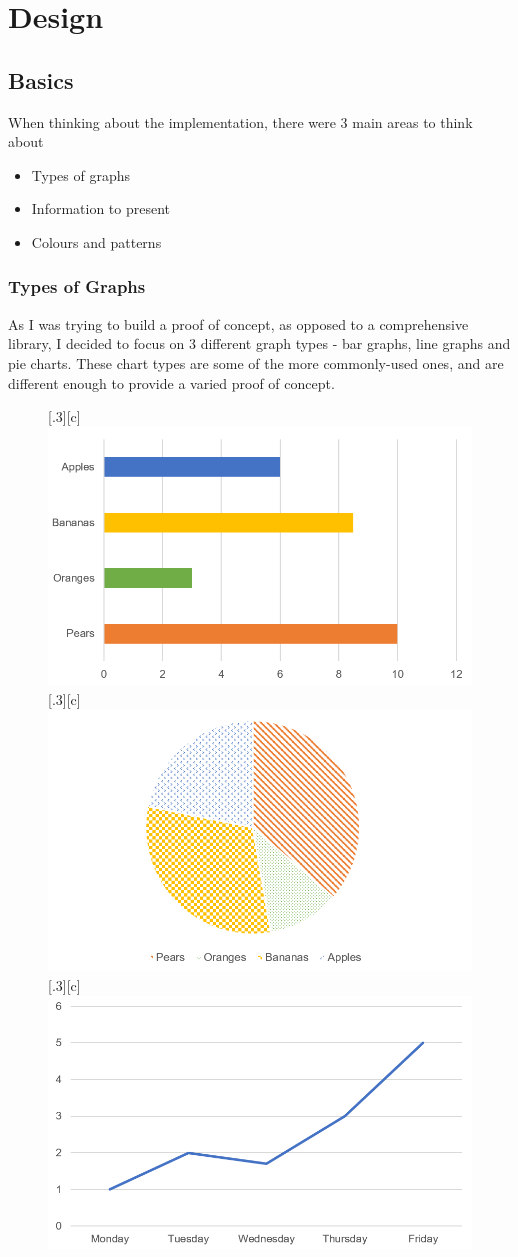 \documentclass[ %
                    author={Aleena Baig},
                supervisor={Dr Simon Lock},
                    degree={BSc},
                     title={On Making Web Accessible Graphs},
                  subtitle={},
                      year={2019} ]{dissertation}
\begin{document}

\chapter{Design}

\section{Basics}

When thinking about the implementation, there were 3 main areas to think about

\begin{itemize}
    \item Types of graphs
    \item Information to present
    \item Colours and patterns
\end{itemize}

\subsection{Types of Graphs}

As I was trying to build a proof of concept, as opposed to a comprehensive library, I decided to focus on 3 different graph types - bar graphs, line graphs and pie charts. These chart types are some of the more commonly-used ones, and are different enough to provide a varied proof of concept.
\newline
\begin{figure}[H]
  \centering
  [.3\linewidth][c]{%
    \includegraphics[width=.3\linewidth]{images/BarGraph.PNG}}\quad
  [.3\linewidth][c]{%
    \includegraphics[width=.3\linewidth]{images/PieGraph.PNG}}\quad
  [.3\linewidth][c]{%
    \includegraphics[width=.3\linewidth]{images/LineGraph.PNG}}
\end{figure}
\end{document}
